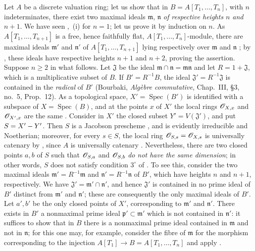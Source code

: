 \begin{env}[10.7.3]
\label{IV.10.7.3}
Let $A$ be a discrete valuation ring; let us show that in $B=A[T_1,\ldots,T_n]$, with $n$ indeterminates, there exist two maximal ideals $\mathfrak{m}$, $\mathfrak{n}$ \emph{of respective heights $n$ and} $n+1$.
We have seen ,~(i) for $n=1$; let us prove it by induction on $n$.
As $A[T_1,\ldots,T_{n+1}]$ is a free, hence faithfully flat, $A[T_1,\ldots,T_n]$-module, there are maximal ideals $\mathfrak{m}'$ and $\mathfrak{n}'$ of $A[T_1,\ldots,T_{n+1}]$ lying respectively over $\mathfrak{m}$ and $\mathfrak{n}$ ; by , these ideals have respective heights $n+1$ and $n+2$, proving the assertion.
Suppose $n\geq 2$ in what follows.
Let $\mathfrak{J}$ be the ideal $\mathfrak{m}\cap\mathfrak{n}=\mathfrak{m}\mathfrak{n}$ and let $R=1+\mathfrak{J}$, which is a multiplicative subset of $B$.
If $B'=R^{-1}B$, the ideal $\mathfrak{J}'=R^{-1}\mathfrak{J}$ is contained in the \emph{radical} of $B'$ (Bourbaki, \emph{Alg\`ebre commutative}, Chap.~III, \S3, no.~5, Prop.~12).
As a topological space, $X'=\operatorname{Spec}(B')$ is identified with a subspace of $X=\operatorname{Spec}(B)$, and at the points $x$ of $X'$ the local rings $\mathscr{O}_{X,x}$ and $\mathscr{O}_{X',x}$ are the same .
Consider in $X'$ the closed subset $Y'=V(\mathfrak{J}')$, and put $S=X'- Y'$.
Then $S$ is a Jacobson prescheme , and is evidently irreducible and Noetherian; moreover, for every $s\in S$, the local ring $\mathscr{O}_{S,s}=\mathscr{O}_{X,s}$ is universally catenary by , since $A$ is universally catenary .
Nevertheless, there are two closed points $a,b$ of $S$ such that $\mathscr{O}_{S,a}$ and $\mathscr{O}_{S,b}$ \emph{do not have the same dimension}; in other words, $S$ does not satisfy condition $3^\circ$ of .
To see this, consider the two maximal ideals $\mathfrak{m}'=R^{-1}\mathfrak{m}$ and $\mathfrak{n}'=R^{-1}\mathfrak{n}$ of $B'$, which have heights $n$ and $n+1$, respectively.
We have $\mathfrak{J}'=\mathfrak{m}'\cap\mathfrak{n}'$, and hence $\mathfrak{J}'$ is contained in no prime ideal of $B'$ distinct from $\mathfrak{m}'$ and $\mathfrak{n}'$; these are consequently the only maximal ideals of $B'$.
Let $a',b'$ be the only closed points of $X'$, corresponding to $\mathfrak{m}'$ and $\mathfrak{n}'$.
There exists in $B'$ a nonmaximal prime ideal $\mathfrak{p}'\subset\mathfrak{m}'$ which is not contained in $\mathfrak{n}'$: it suffices to show that in $B$ there is a nonmaximal prime ideal contained in $\mathfrak{m}$ and not in $\mathfrak{n}$; for this one may, for example, consider the fibre of $\mathfrak{m}$ for the morphism corresponding to the injection $A[T_1]\longrightarrow B=A[T_1,\ldots,T_n]$ and apply .

\end{env}

